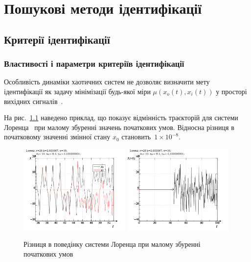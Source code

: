 \chapter{Пошукові методи ідентифікації}

\section{Критерії ідентифікації} %

\subsection{Властивості і параметри критеріїв ідентифікації} %

Особливість динаміки хаотичних систем не дозволяє визначити мету ідентифікації
як задачу мінімізації будь-якої міри
$\mu(x_o(t), x_i(t))$ у просторі вихідних
сигналів~\cite{atu_asau11,atu_asau12,atu_asau14,atu_electronika2013}.


На рис.~\ref{atu:f:lor_diff_x0} наведено приклад, що показує відмінність
траєкторій для системи Лоренца~\cite{moon_chaotic_vibr} при малому збуренні
значень початкових умов. Відносна різниця в початковому
значенні змінної стану
$x_0$ становить~$1 \times 10^{-8}$.

\begin{figure}[htb!]
  \begin{center}
    \includegraphics[width=0.49\textwidth]{p/lor_diff-p_xx_x0.png}
    \hfill
    \includegraphics[width=0.49\textwidth]{p/lor_diff-p_dx_x0.png}
  \end{center}
\caption{Різниця в поведінку системи Лоренца при малому збуренні початкових умов}
\label{atu:f:lor_diff_x0}
\end{figure}


